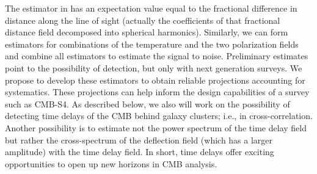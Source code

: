  
 The estimator in  has an expectation value equal to the fractional difference in distance along the line of sight (actually the coefficients of that fractional distance field decomposed into spherical harmonics). Similarly, we can form estimators for combinations of the temperature and the two polarization fields and combine all estimators to estimate the signal to noise. Preliminary estimates point to the possibility of detection, but only with next generation surveys. We propose to develop these estimators to obtain reliable projections accounting for systematics. These projections can help inform the design capabilities of a survey such as CMB-S4. As described below, we also will work on the possibility of detecting time delays of the CMB behind galaxy clusters; i.e., in cross-correlation. Another possibility is to estimate not the power spectrum of the time delay field but rather the cross-spectrum of the deflection field (which has a larger amplitude) with the time delay field. In short, time delays offer exciting opportunities to open up new horizons in CMB analysis.